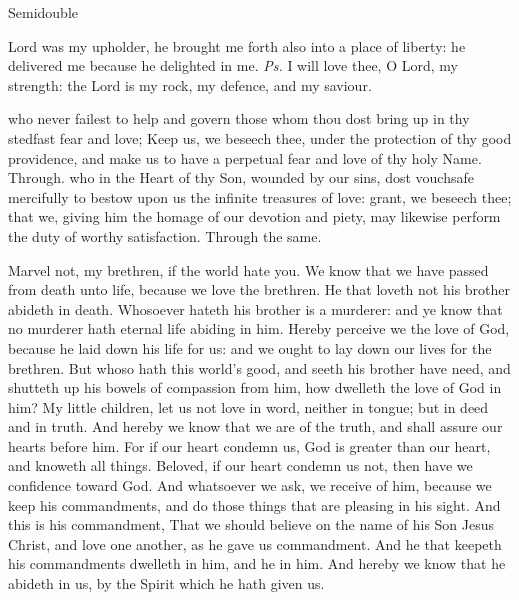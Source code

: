\begin{inhead}
    {Semidouble}
\end{inhead}

\properantiphonfix

\introit
{} Lord was my upholder, he brought me forth also into a place of liberty: he delivered me because he delighted in me. \textit{Ps.} I will love thee, O Lord, my strength: the Lord is my rock, my defence, and my saviour.

\collect
{} who never failest to help and govern those whom thou dost bring up in thy stedfast fear and love; Keep us, we beseech thee, under the protection of thy good providence, and make us to have a perpetual fear and love of thy holy Name. Through.
 who in the Heart of thy Son, wounded by our sins, dost vouchsafe mercifully to bestow upon us the infinite treasures of love: grant, we beseech thee; that we, giving him the homage of our devotion and piety, may likewise perform the duty of worthy satisfaction. Through the same.

 Marvel not, my brethren, if the world hate you. We know that we have passed from death unto life, because we love the brethren. He that loveth not his brother abideth in death. Whosoever hateth his brother is a murderer: and ye know that no murderer hath eternal life abiding in him. Hereby perceive we the love of God, because he laid down his life for us: and we ought to lay down our lives for the brethren. But whoso hath this world's good, and seeth his brother have need, and shutteth up his bowels of compassion from him, how dwelleth the love of God in him? My little children, let us not love in word, neither in tongue; but in deed and in truth. And hereby we know that we are of the truth, and shall assure our hearts before him. For if our heart condemn us, God is greater than our heart, and knoweth all things. Beloved, if our heart condemn us not, then have we confidence toward God. And whatsoever we ask, we receive of him, because we keep his commandments, and do those things that are pleasing in his sight. And this is his commandment, That we should believe on the name of his Son Jesus Christ, and love one another, as he gave us commandment. And he that keepeth his commandments dwelleth in him, and he in him. And hereby we know that he abideth in us, by the Spirit which he hath given us.


